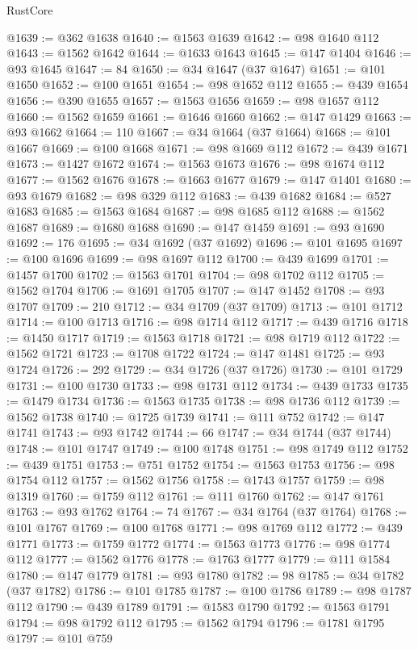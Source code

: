 \begin{lexlean}{RustCore}
\begin{coremodule}
@1639 := @362 @1638
@1640 := @1563 @1639
@1642 := @98 @1640 @112
@1643 := @1562 @1642
@1644 := @1633 @1643
@1645 := @147 @1404
@1646 := @93 @1645
@1647 := 84
@1650 := @34 @1647 (@37 @1647)
@1651 := @101 @1650
@1652 := @100 @1651
@1654 := @98 @1652 @112
@1655 := @439 @1654
@1656 := @390 @1655
@1657 := @1563 @1656
@1659 := @98 @1657 @112
@1660 := @1562 @1659
@1661 := @1646 @1660
@1662 := @147 @1429
@1663 := @93 @1662
@1664 := 110
@1667 := @34 @1664 (@37 @1664)
@1668 := @101 @1667
@1669 := @100 @1668
@1671 := @98 @1669 @112
@1672 := @439 @1671
@1673 := @1427 @1672
@1674 := @1563 @1673
@1676 := @98 @1674 @112
@1677 := @1562 @1676
@1678 := @1663 @1677
@1679 := @147 @1401
@1680 := @93 @1679
@1682 := @98 @329 @112
@1683 := @439 @1682
@1684 := @527 @1683
@1685 := @1563 @1684
@1687 := @98 @1685 @112
@1688 := @1562 @1687
@1689 := @1680 @1688
@1690 := @147 @1459
@1691 := @93 @1690
@1692 := 176
@1695 := @34 @1692 (@37 @1692)
@1696 := @101 @1695
@1697 := @100 @1696
@1699 := @98 @1697 @112
@1700 := @439 @1699
@1701 := @1457 @1700
@1702 := @1563 @1701
@1704 := @98 @1702 @112
@1705 := @1562 @1704
@1706 := @1691 @1705
@1707 := @147 @1452
@1708 := @93 @1707
@1709 := 210
@1712 := @34 @1709 (@37 @1709)
@1713 := @101 @1712
@1714 := @100 @1713
@1716 := @98 @1714 @112
@1717 := @439 @1716
@1718 := @1450 @1717
@1719 := @1563 @1718
@1721 := @98 @1719 @112
@1722 := @1562 @1721
@1723 := @1708 @1722
@1724 := @147 @1481
@1725 := @93 @1724
@1726 := 292
@1729 := @34 @1726 (@37 @1726)
@1730 := @101 @1729
@1731 := @100 @1730
@1733 := @98 @1731 @112
@1734 := @439 @1733
@1735 := @1479 @1734
@1736 := @1563 @1735
@1738 := @98 @1736 @112
@1739 := @1562 @1738
@1740 := @1725 @1739
@1741 := @111 @752
@1742 := @147 @1741
@1743 := @93 @1742
@1744 := 66
@1747 := @34 @1744 (@37 @1744)
@1748 := @101 @1747
@1749 := @100 @1748
@1751 := @98 @1749 @112
@1752 := @439 @1751
@1753 := @751 @1752
@1754 := @1563 @1753
@1756 := @98 @1754 @112
@1757 := @1562 @1756
@1758 := @1743 @1757
@1759 := @98 @1319
@1760 := @1759 @112
@1761 := @111 @1760
@1762 := @147 @1761
@1763 := @93 @1762
@1764 := 74
@1767 := @34 @1764 (@37 @1764)
@1768 := @101 @1767
@1769 := @100 @1768
@1771 := @98 @1769 @112
@1772 := @439 @1771
@1773 := @1759 @1772
@1774 := @1563 @1773
@1776 := @98 @1774 @112
@1777 := @1562 @1776
@1778 := @1763 @1777
@1779 := @111 @1584
@1780 := @147 @1779
@1781 := @93 @1780
@1782 := 98
@1785 := @34 @1782 (@37 @1782)
@1786 := @101 @1785
@1787 := @100 @1786
@1789 := @98 @1787 @112
@1790 := @439 @1789
@1791 := @1583 @1790
@1792 := @1563 @1791
@1794 := @98 @1792 @112
@1795 := @1562 @1794
@1796 := @1781 @1795
@1797 := @101 @759

\end{coremodule}
\end{lexlean}
